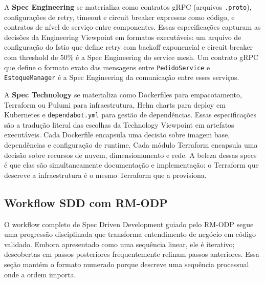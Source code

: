A \textbf{Spec Engineering} se materializa como contratos gRPC (arquivos
\texttt{.proto}), configurações de retry, timeout e circuit breaker expressas como
código, e contratos de nível de serviço entre componentes. Essas especificações
capturam as decisões da Engineering Viewpoint em formatos executáveis: um arquivo
de configuração do Istio que define retry com backoff exponencial e circuit breaker
com threshold de 50\% é a Spec Engineering do service mesh. Um contrato gRPC que
define o formato exato das mensagens entre \texttt{PedidoService} e
\texttt{EstoqueManager} é a Spec Engineering da comunicação entre esses serviços.

A \textbf{Spec Technology} se materializa como Dockerfiles para empacotamento,
Terraform ou Pulumi para infraestrutura, Helm charts para deploy em Kubernetes
e \texttt{dependabot.yml} para gestão de dependências. Essas especificações são
a tradução literal das escolhas da Technology Viewpoint em artefatos executáveis.
Cada Dockerfile encapsula uma decisão sobre imagem base, dependências e
configuração de runtime. Cada módulo Terraform encapsula uma decisão sobre
recursos de nuvem, dimensionamento e rede. A beleza dessas specs é que elas são
simultaneamente documentação e implementação: o Terraform que descreve a
infraestrutura é o mesmo Terraform que a provisiona.

\subsection{Workflow SDD com RM-ODP}

O workflow completo de Spec Driven Development guiado pelo RM-ODP segue uma
progressão disciplinada que transforma entendimento de negócio em código
validado. Embora apresentado como uma sequência linear, ele é
iterativo; descobertas em passos posteriores frequentemente refinam passos
anteriores. Essa seção mantém o formato numerado porque descreve uma sequência
processual onde a ordem importa.


